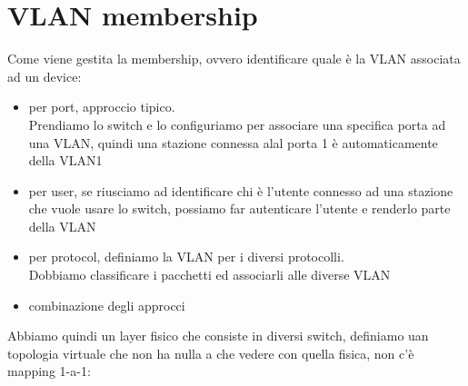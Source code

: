\documentclass[12pt, oneside]{extbook} %
\begin{document}
\section{VLAN membership}
Come viene gestita la membership, ovvero identificare quale è la VLAN associata ad un device:
    \begin{itemize}
        \item per port, approccio tipico.
        \\Prendiamo lo switch e lo configuriamo per associare una specifica porta ad una VLAN, quindi una stazione connessa alal porta 1 è automaticamente della VLAN1
        \item per user, se riusciamo ad identificare chi è l'utente connesso ad una stazione che vuole usare lo switch, possiamo far autenticare l'utente e renderlo parte della VLAN
        \item per protocol, definiamo la VLAN per i diversi protocolli.
        \\Dobbiamo classificare i pacchetti ed associarli alle diverse VLAN
        \item combinazione degli approcci
    \end{itemize}
Abbiamo quindi un layer fisico che consiste in diversi switch, definiamo uan topologia virtuale che non ha nulla a che vedere con quella fisica, non c'è mapping 1-a-1:
\end{document}
